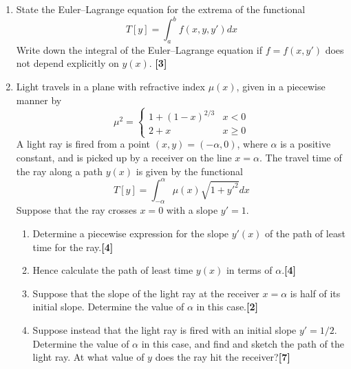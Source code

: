 \documentclass[a4paper]{article}
\begin{document}
\begin{qns}\leavevmode
\begin{enumerate}[label=(\alph*)]
\item State the Euler–Lagrange equation for the extrema of the functional
$$T[y]=\int_a^bf(x,y,y')dx$$
Write down the integral of the Euler–Lagrange equation if $f = f(x, y')$ does not depend explicitly on $y(x)$. \hfill\textbf{[3]}
\item Light travels in a plane with refractive index $\mu(x)$, given in a piecewise manner by
$$\mu^2=
\left\{
        \begin{array}{ll}
      1+(1-x)^{2/3} & x<0 \\
      2+x & x\geq0 
        \end{array}
    \right.$$
A light ray is fired from a point $(x, y) = (−\alpha, 0)$, where $\alpha$ is a positive constant, and is picked up by a receiver on the line $x = \alpha$. The travel time of the ray along a path $y(x)$ is given by the functional
$$T[y]=\int_{-\alpha}^\alpha\mu(x)\sqrt{1+y'^2}dx$$
Suppose that the ray crosses $x = 0$ with a slope $y' = 1$.
\begin{enumerate}[label=(\roman*)]
\item Determine a piecewise expression for the slope $y'(x)$ of the path of least time for the ray.\hfill\textbf{[4]}
\item Hence calculate the path of least time $y(x)$ in terms of $\alpha$.\hfill\textbf{[4]}
\item Suppose that the slope of the light ray at the receiver $x = \alpha$ is half of its initial slope. Determine the value of $\alpha$ in this case.\hfill\textbf{[2]}
\item Suppose instead that the light ray is fired with an initial slope $y' = 1/2$. Determine the value of $\alpha$ in this case, and find and sketch the path of the light ray. At what value of $y$ does the ray hit the receiver?\hfill\textbf{[7]}
\end{enumerate}
\end{enumerate}
\end{qns}
\end{document}
